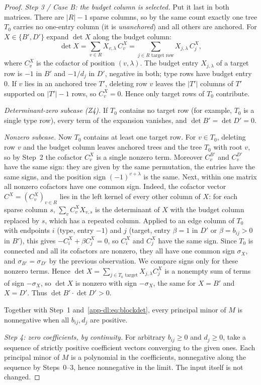 \begin{proof}
\emph{Step 3 / Case B: the budget column is selected.} Put it last in both matrices. There are $|R|-1$
sparse columns, so by the same count exactly one tree $T_0$ carries no one-entry column (it is
\emph{unanchored}) and all others are anchored. For $X\in\{B',D'\}$ expand $\det X$ along the budget
column:
\[
  \det X=\sum_{v\in R}X_{v,\lambda}\,C^X_v=\sum_{j\in R\text{ target row}}X_{j,\lambda}\,C^X_j,
\]
where $C^X_v$ is the cofactor of position $(v,\lambda)$. The budget entry $X_{j,\lambda}$ of a target row is $-1$ in $B'$ and $-1/d_j$ in $D'$, negative in both; type rows have budget entry $0$. If $v$ lies in an anchored tree $T'$, deleting
row $v$ leaves the $|T'|$ columns of $T'$ supported on $|T'|-1$ rows, so $C^X_v=0$. Hence only target rows
of $T_0$ contribute.

\emph{Determinant-zero subcase (Z4).} If $T_0$ contains no target row (for example, $T_0$ is a single type
row), every term of the expansion vanishes, and $\det B'=\det D'=0$.

\emph{Nonzero subcase.} Now $T_0$ contains at least one target row. For $v\in T_0$, deleting row $v$ and
the budget column leaves anchored trees and the tree $T_0$ with root $v$, so by Step~2 the cofactor
$C^X_v$ is a single nonzero term. Moreover $C^{B'}_v$ and $C^{D'}_v$ have the same sign: they are given by
the same permutation, the entries have the same signs, and the position sign $(-1)^{v+\lambda}$ is the
same. Next, within one matrix all nonzero cofactors have one common sign. Indeed, the cofactor vector
$C^X=(C^X_v)_{v\in R}$ lies in the left kernel of every other column of $X$: for each sparse column $s$,
$\sum_vC^X_vX_{v,s}$ is the determinant of $X$ with the budget column replaced by $s$, which has a
repeated column. Applied to an edge column of $T_0$ with endpoints $i$ (type, entry $-1$) and $j$
(target, entry $\beta=1$ in $D'$ or $\beta=b_{ij}>0$ in $B'$), this gives $-C^X_i+\beta C^X_j=0$, so
$C^X_i$ and $C^X_j$ have the same sign. Since $T_0$ is connected and all its cofactors are nonzero, they
all have one common sign $\sigma_X$, and $\sigma_{B'}=\sigma_{D'}$ by the previous observation. We compare
signs only for these nonzero terms. Hence $\det X=\sum_{j\in T_0\text{ target}}X_{j,\lambda}C^X_j$ is a nonempty sum of terms of sign $-\sigma_X$, so $\det X$ is nonzero with sign $-\sigma_X$, the same for $X=B'$ and
$X=D'$. Thus $\det B'\cdot\det D'>0$.

Together with Step~1 and~\eqref{app-dl:eq:blockdet}, every principal minor of $M$ is nonnegative when
all $b_{ij},d_j$ are positive.

\emph{Step 4: zero coefficients, by continuity.} For arbitrary $b_{ij}\ge0$ and $d_j\ge0$, take a sequence
of strictly positive coefficient vectors converging to the given ones. Each principal minor of $M$ is a
polynomial in the coefficients, nonnegative along the sequence by Steps~0--3, hence nonnegative in the
limit. The input itself is not changed.
\end{proof}


